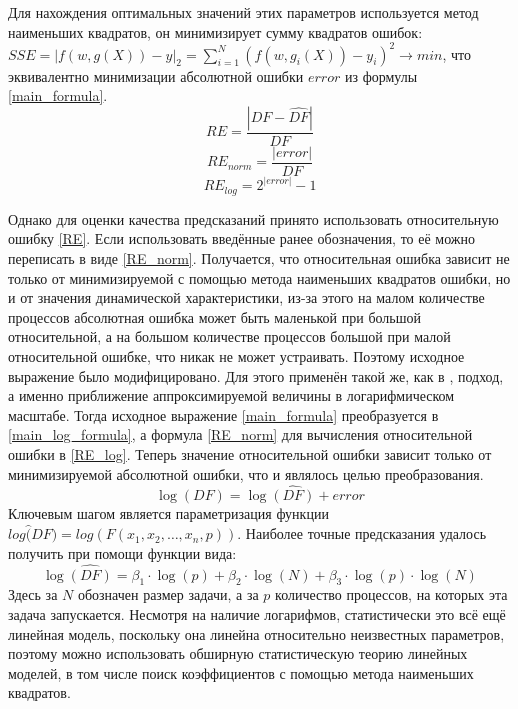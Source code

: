 		Для нахождения оптимальных значений этих параметров используется метод наименьших квадратов, он минимизирует сумму квадратов ошибок: \(SSE = |f(w, g(X)) - y|_2 = \sum_{i = 1}^{N}{(f(w, g_i(X)) - y_i)^2 \rightarrow min}\), что эквивалентно минимизации абсолютной ошибки \(error\) из формулы \eqref{main_formula}.
		\begin{equation}
			\label{RE} 
			RE = \frac{|DF - \hat{DF}|}{DF}
		\end{equation}
		\begin{equation}
			\label{RE_norm}
			RE_{norm} = \frac{|error|}{DF}
		\end{equation}
		\begin{equation}
			\label{RE_log}
			RE_{log}= 2^{|error|} - 1
		\end{equation}

		Однако для оценки качества предсказаний принято использовать относительную ошибку \eqref{RE}. Если использовать введённые ранее обозначения, то её можно переписать в виде \eqref{RE_norm}. Получается, что относительная ошибка зависит не только от минимизируемой с помощью метода наименьших квадратов ошибки, но и от значения динамической характеристики, из-за этого на малом количестве процессов абсолютная ошибка может быть маленькой при большой относительной, а на большом количестве процессов большой при малой относительной ошибке, что никак не может устраивать. Поэтому исходное выражение было модифицировано. Для этого применён такой же, как в \cite{log_main}, подход, а именно приближение аппроксимируемой величины в логарифмическом масштабе. Тогда исходное выражение \eqref{main_formula} преобразуется в \eqref{main_log_formula}, а формула \eqref{RE_norm} для вычисления относительной ошибки в \eqref{RE_log}. Теперь значение относительной ошибки зависит только от минимизируемой абсолютной ошибки, что и являлось целью преобразования.
		\begin{equation}\label{main_log_formula}
		\log{(DF)} = \log{\hat{(DF)}} + error
		\end{equation}
		Ключевым шагом является параметризация функции \(log{\hat(DF)} = log(F(x_1, x_2, \ldots, x_n, p))\). Наиболее точные предсказания удалось получить при помощи функции вида:
		\begin{equation}
		\log{\hat{(DF)}} = \beta_{1} \cdot \log{(p)} + \beta_{2} \cdot \log{(N)} + \beta_{3} \cdot \log{(p)} \cdot \log{(N)}
		\end{equation}
		Здесь за \(N\) обозначен размер задачи, а за \(p\) количество процессов, на которых эта задача запускается. Несмотря на наличие логарифмов, статистически это всё ещё линейная модель, поскольку она линейна относительно неизвестных параметров, поэтому можно использовать обширную статистическую теорию линейных моделей, в том числе поиск коэффициентов с помощью метода наименьших квадратов.

